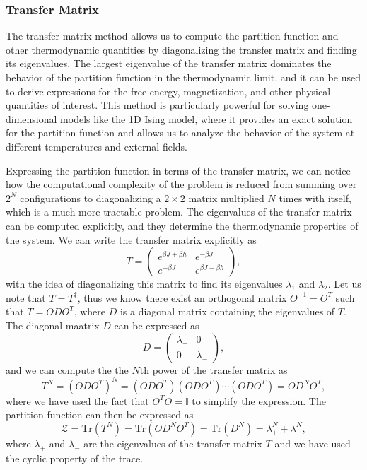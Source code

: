 \subsubsection{Transfer Matrix}

The transfer matrix method allows us to compute the partition function and other thermodynamic quantities by diagonalizing the transfer matrix and finding its eigenvalues. The largest eigenvalue of the transfer matrix dominates the behavior of the partition function in the thermodynamic limit, and it can be used to derive expressions for the free energy, magnetization, and other physical quantities of interest. This method is particularly powerful for solving one-dimensional models like the 1D Ising model, where it provides an exact solution for the partition function and allows us to analyze the behavior of the system at different temperatures and external fields.

Expressing the partition function in terms of the transfer matrix, we can notice how the computational complexity of the problem is reduced from summing over \(2^N\) configurations to diagonalizing a \(2 \times 2\) matrix multiplied \(N\) times with itself, which is a much more tractable problem. The eigenvalues of the transfer matrix can be computed explicitly, and they determine the thermodynamic properties of the system. We can write the transfer matrix explicitly as
\[
    T = \begin{pmatrix}
        e^{\beta J + \beta h} & e^{-\beta J}          \\
        e^{-\beta J}          & e^{\beta J - \beta h}
    \end{pmatrix},
\]
with the idea of diagonalizing this matrix to find its eigenvalues \(\lambda_1\) and \(\lambda_2\). Let us note that \(T = T^{\dagger}\), thus we know there exist an orthogonal matrix \(O^{-1} = O^T\) such that \(T = O D O^{T}\), where \(D\) is a diagonal matrix containing the eigenvalues of \(T\). The diagonal maatrix \(D\) can be expressed as
\[
    D = \begin{pmatrix}
        \lambda_+ & 0         \\
        0         & \lambda_-
    \end{pmatrix},
\]
and we can compute the the \(N\)th power of the transfer matrix as
\[
    T^N = (ODO^T)^N = (ODO^T)(ODO^T)\cdots(ODO^T) = O D^N O^T,
\]
where we have used the fact that \(O^T O = \mathbb{I}\) to simplify the expression. The partition function can then be expressed as
\[
    \mathcal{Z} = \text{Tr}(T^N) = \text{Tr}(O D^N O^T) = \text{Tr}(D^N) = \lambda_+^N + \lambda_-^N,
\]
where \(\lambda_+\) and \(\lambda_-\) are the eigenvalues of the transfer matrix \(T\) and we have used the cyclic property of the trace.


